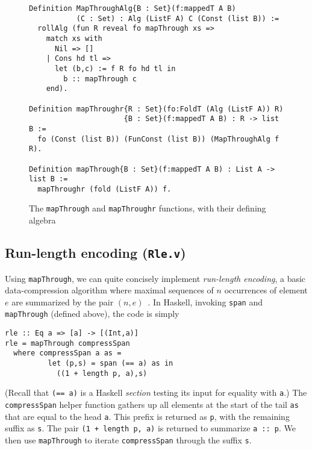 \documentclass[a4paper,USenglish]{lipics-v2021}
\begin{document}
\begin{figure}
\begin{verbatim}
Definition MapThroughAlg{B : Set}(f:mappedT A B)
           (C : Set) : Alg (ListF A) C (Const (list B)) :=
  rollAlg (fun R reveal fo mapThrough xs => 
    match xs with
      Nil => []
    | Cons hd tl =>
      let (b,c) := f R fo hd tl in
        b :: mapThrough c
    end).

Definition mapThroughr{R : Set}(fo:FoldT (Alg (ListF A)) R)
                      {B : Set}(f:mappedT A B) : R -> list B :=
  fo (Const (list B)) (FunConst (list B)) (MapThroughAlg f R).

Definition mapThrough{B : Set}(f:mappedT A B) : List A -> list B :=
  mapThroughr (fold (ListF A)) f.
\end{verbatim}
\caption{The \texttt{mapThrough} and \texttt{mapThroughr} functions,
  with their defining algebra}
\label{fig:mapthrough}
\end{figure}

\subsection{Run-length encoding (\texttt{Rle.v})}

Using \verb|mapThrough|, we can quite concisely implement
\emph{run-length encoding}, a basic data-compression algorithm where
maximal sequences of $n$ occurrences of element $e$ are summarized by
the pair $(n,e)$~\cite{datacomp}.  In Haskell, invoking \verb|span| and
\verb|mapThrough| (defined above), the code is simply
\begin{verbatim}
rle :: Eq a => [a] -> [(Int,a)]
rle = mapThrough compressSpan
  where compressSpan a as =
          let (p,s) = span (== a) as in
            ((1 + length p, a),s)
\end{verbatim} 
\noindent (Recall that \verb|(== a)| is a Haskell \emph{section}
testing its input for equality with \verb|a|.)  The
\verb|compressSpan| helper function gathers up all elements at the
start of the tail \verb|as| that are equal to the head \verb|a|.  This
prefix is returned as \verb|p|, with the remaining suffix as \verb|s|.
The pair \verb|(1 + length p, a)| is returned to summarize
\verb|a :: p|.  We then use \verb|mapThrough| to iterate
\verb|compressSpan| through the suffix \verb|s|.
\end{document}
